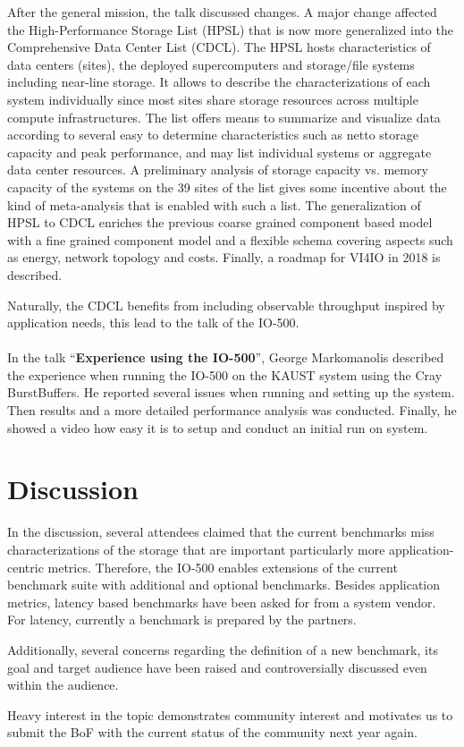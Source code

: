 \documentclass{llncs}
\begin{document}
After the general mission, the talk discussed changes.
A major change affected the High-Performance Storage List (HPSL) that is now more generalized into the Comprehensive Data Center List (CDCL).
The HPSL hosts characteristics of data centers (sites), the deployed supercomputers and storage/file systems including near-line storage. It allows to describe the characterizations of each system individually since most sites share storage resources across multiple compute infrastructures. The list offers means to summarize and visualize data according to several easy to determine characteristics such as netto storage capacity and peak performance, and may list individual systems or aggregate data center resources.
A preliminary analysis of storage capacity vs. memory capacity of the systems on the 39 sites of the list gives some incentive about the kind of meta-analysis that is enabled with such a list.
The generalization of HPSL to CDCL enriches the previous coarse grained component based model with a fine grained component model and a flexible schema covering aspects such as energy, network topology and costs.
Finally, a roadmap for VI4IO in 2018 is described.

Naturally, the CDCL benefits from including observable throughput inspired by application needs, this lead to the talk of the IO-500.



\paragraph{}
In the talk “\textbf{Experience using the IO-500}”, George Markomanolis described the experience when running the IO-500 on the KAUST system using the Cray BurstBuffers.
He reported several issues when running and setting up the system.
Then results and a more detailed performance analysis was conducted.
Finally, he showed a video how easy it is to setup and conduct an initial run on system.


\section{Discussion}


In the discussion, several attendees claimed that the current benchmarks miss  characterizations of the storage that are important particularly more application-centric metrics.
Therefore, the IO-500 enables extensions of the current benchmark suite with additional and optional benchmarks.
Besides application metrics, latency based benchmarks have been asked for from a system vendor.
For latency, currently a benchmark is prepared by the partners.

Additionally, several concerns regarding the definition of a new benchmark, its goal and target audience have been raised and controversially discussed even within the audience.

Heavy interest in the topic demonstrates community interest and motivates us to submit the BoF with the current status of the community next year again.
\end{document}
